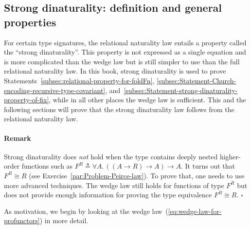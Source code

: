 \subsection{Strong dinaturality: definition and general properties\label{subsec:Strong-dinaturality.-General-properties}}

For certain type signatures, the relational naturality law entails
a property called the \textsf{``}strong dinaturality\textsf{''}. This property is
not expressed as a single equation and is more complicated than the
wedge law but is still simpler to use than the full relational naturality
law. In this book, strong dinaturality is used to prove Statements~\ref{subsec:relational-property-for-foldFn},
\ref{subsec:Statement-Church-encoding-recursive-type-covariant},
and~\ref{subsec:Statement-strong-dinaturality-property-of-fix},
while in all other places the wedge law is sufficient. This and the
following sections will prove that the strong dinaturality law follows
from the relational naturality law.

\paragraph{Remark}

Strong dinaturality does \emph{not} hold when the type contains deeply
nested higher-order functions such as $F^{R}\triangleq\forall A.\,(\left(A\rightarrow R\right)\rightarrow A)\rightarrow A$.
It turns out that $F^{R}\cong R$ (see Exercise~\ref{par:Problem-Peirce-law}).
To prove that, one needs to use more advanced techniques. The wedge
law still holds for functions of type $F^{R}$ but does not provide
enough information for proving the type equivalence $F^{R}\cong R$.
$\square$

As motivation, we begin by looking at the wedge law~(\ref{eq:wedge-law-for-profunctors})
in more detail.

